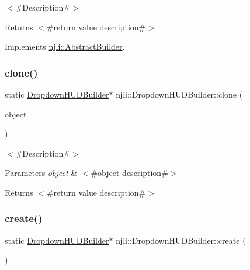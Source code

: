 $<$\#\+Description\#$>$

\begin{DoxyReturn}{Returns}
$<$\#return value description\#$>$ 
\end{DoxyReturn}


Implements \mbox{\hyperlink{classnjli_1_1_abstract_builder_aa1d220053e182c37b31b427499c6eacf}{njli\+::\+Abstract\+Builder}}.

\mbox{\label{classnjli_1_1_dropdown_h_u_d_builder_aca6da429a5e00cc0a42ababa96af00fa}} 
\subsubsection{\texorpdfstring{clone()}{clone()}}
{\footnotesize\ttfamily static \mbox{\hyperlink{classnjli_1_1_dropdown_h_u_d_builder}{Dropdown\+H\+U\+D\+Builder}}$\ast$ njli\+::\+Dropdown\+H\+U\+D\+Builder\+::clone (\begin{DoxyParamCaption}\item[{const \mbox{\hyperlink{classnjli_1_1_dropdown_h_u_d_builder}{Dropdown\+H\+U\+D\+Builder}} \&}]{object }\end{DoxyParamCaption})\hspace{0.3cm}{\ttfamily [static]}}

$<$\#\+Description\#$>$


\begin{DoxyParams}{Parameters}
{\em object} & $<$\#object description\#$>$\\
\hline
\end{DoxyParams}
\begin{DoxyReturn}{Returns}
$<$\#return value description\#$>$ 
\end{DoxyReturn}
\mbox{\label{classnjli_1_1_dropdown_h_u_d_builder_a96f017bc6d7b45dec3ef8ee888df6b3b}} 
\subsubsection{\texorpdfstring{create()}{create()}}
{\footnotesize\ttfamily static \mbox{\hyperlink{classnjli_1_1_dropdown_h_u_d_builder}{Dropdown\+H\+U\+D\+Builder}}$\ast$ njli\+::\+Dropdown\+H\+U\+D\+Builder\+::create (\begin{DoxyParamCaption}{ }\end{DoxyParamCaption})\hspace{0.3cm}{\ttfamily [static]}}

